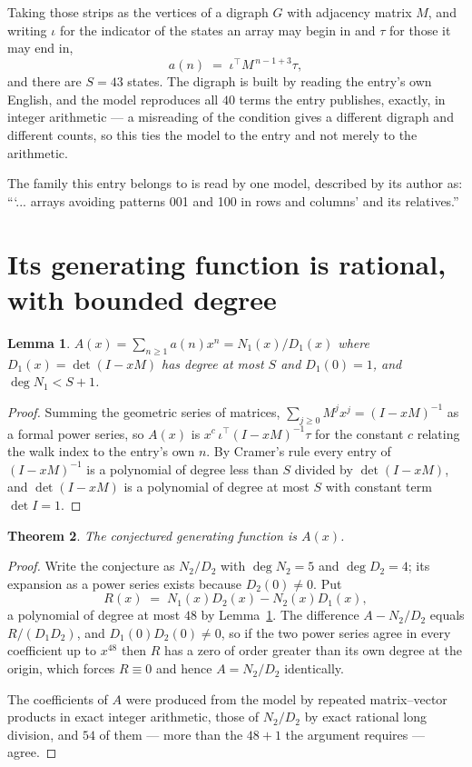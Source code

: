 \documentclass[11pt,a4paper]{article}
\theoremstyle{plain}
\newtheorem{theorem}{Theorem}
\newtheorem{lemma}[theorem]{Lemma}
\theoremstyle{definition}
\begin{document}
Taking those strips as the vertices of a digraph $G$ with adjacency matrix $M$, and writing
$\iota$ for the indicator of the states an array may begin in and $\tau$ for those it may end
in,
\[
a(n)\;=\;\iota^{\!\top}M^{\,n-1+3}\tau ,
\]
and there are $S=43$ states. The digraph is built by reading the entry's own English, and the
model reproduces all $40$ terms the entry publishes, exactly, in integer arithmetic --- a
misreading of the condition gives a different digraph and different counts, so this ties the
model to the entry and not merely to the arithmetic.

The family this entry belongs to is read by one model, described by its author as: ```... arrays avoiding patterns 001 and 100 in rows and columns' and its relatives.''


\section{Its generating function is rational, with bounded degree}

\begin{lemma}\label{lem:rat}
$A(x)=\sum_{n\ge1}a(n)x^n=N_1(x)/D_1(x)$ where $D_1(x)=\det(I-xM)$ has degree at most
$S$ and $D_1(0)=1$, and $\deg N_1<S+1$.
\end{lemma}

\begin{proof}
Summing the geometric series of matrices, $\sum_{j\ge0}M^jx^j=(I-xM)^{-1}$ as a formal
power series, so $A(x)$ is $x^{c}\,\iota^{\!\top}(I-xM)^{-1}\tau$ for the constant $c$
relating the walk index to the entry's own $n$. By Cramer's rule every entry of
$(I-xM)^{-1}$ is a polynomial of degree less than $S$ divided by $\det(I-xM)$, and
$\det(I-xM)$ is a polynomial of degree at most $S$ with constant term $\det I=1$.
\end{proof}

\begin{theorem}
The conjectured generating function is $A(x)$.
\end{theorem}

\begin{proof}
Write the conjecture as $N_2/D_2$ with $\deg N_2=5$ and $\deg D_2=4$; its expansion as a
power series exists because $D_2(0)\neq0$. Put
\[
R(x)\;=\;N_1(x)D_2(x)-N_2(x)D_1(x),
\]
a polynomial of degree at most $48$ by Lemma~\ref{lem:rat}. The difference
$A-N_2/D_2$ equals $R/(D_1D_2)$, and $D_1(0)D_2(0)\neq0$, so if the two power series agree in
every coefficient up to $x^{48}$ then $R$ has a zero of order greater than its own
degree at the origin, which forces $R\equiv0$ and hence $A=N_2/D_2$ identically.

The coefficients of $A$ were produced from the model by repeated matrix--vector products in
exact integer arithmetic, those of $N_2/D_2$ by exact rational long division, and $54$
of them --- more than the $48+1$ the argument requires --- agree.
\end{proof}
\end{document}
